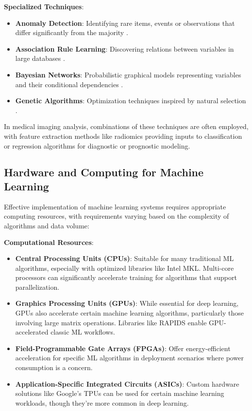 \textbf{Specialized Techniques}:
\begin{itemize}
  \item \textbf{Anomaly Detection}: Identifying rare items, events or observations that differ significantly from the majority \cite{chandola2009anomaly}.
  \item \textbf{Association Rule Learning}: Discovering relations between variables in large databases \cite{agrawal1993mining}.
  \item \textbf{Bayesian Networks}: Probabilistic graphical models representing variables and their conditional dependencies \cite{pearl1988probabilistic}.
  \item \textbf{Genetic Algorithms}: Optimization techniques inspired by natural selection \cite{holland1992adaptation}.
\end{itemize}

In medical imaging analysis, combinations of these techniques are often employed, with feature extraction methods like radiomics providing inputs to classification or regression algorithms for diagnostic or prognostic modeling.

\subsection{Hardware and Computing for Machine Learning}
\label{sec:ml_hardware}
Effective implementation of machine learning systems requires appropriate computing resources, with requirements varying based on the complexity of algorithms and data volume:

\textbf{Computational Resources}:
\begin{itemize}
  \item \textbf{Central Processing Units (CPUs)}: Suitable for many traditional ML algorithms, especially with optimized libraries like Intel MKL. Multi-core processors can significantly accelerate training for algorithms that support parallelization.

  \item \textbf{Graphics Processing Units (GPUs)}: While essential for deep learning, GPUs also accelerate certain machine learning algorithms, particularly those involving large matrix operations. Libraries like RAPIDS enable GPU-accelerated classic ML workflows.

  \item \textbf{Field-Programmable Gate Arrays (FPGAs)}: Offer energy-efficient acceleration for specific ML algorithms in deployment scenarios where power consumption is a concern.

  \item \textbf{Application-Specific Integrated Circuits (ASICs)}: Custom hardware solutions like Google's TPUs can be used for certain machine learning workloads, though they're more common in deep learning.
\end{itemize}

